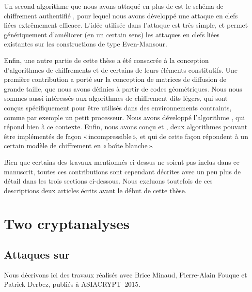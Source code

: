 Un second algorithme que nous avons attaqué en plus de \shaone est le schéma de chiffrement authentifié \proestotr, pour lequel nous avons développé une attaque en clefs liées
extrêmement efficace. L'idée utilisée dans l'attaque est très simple, et permet génériquement d'améliorer (en un certain sens) les attaques en clefs liées existantes sur les constructions
de type Even-Mansour.

\medskip

Enfin, une autre partie de cette thèse a été consacrée à la conception d'algorithmes de chiffrements et de certains de leurs éléments constitutifs.
Une première contribution a porté sur la conception de matrices de diffusion de grande taille, que nous avons définies à partir de codes géométriques.
Nous nous sommes aussi intéressés aux algorithmes de chiffrement dits légers, qui sont conçus spécifiquement pour être utilisés dans des environnements
contraints, comme par exemple un petit processeur. Nous avons développé l'algorithme \fly, qui répond bien à ce contexte.
Enfin, nous avons conçu \pc et \cdb, deux algorithmes pouvant être implémentés de façon «\,incompressible\,», et qui de cette façon répondent à un certain modèle
de chiffrement en «\,boîte blanche\,». 

\bigskip

Bien que certains des travaux mentionnés ci-dessus ne soient pas inclus dans ce manuscrit, toutes ces contributions sont cependant
décrites avec un peu plus de détail dans les trois sections ci-dessous. Nous excluons toutefois de ces descriptions deux articles écrits avant le début de cette thèse.

\section[Deux cryptanalyses]{Two cryptanalyses}

\subsection{Attaques sur \asasa \cite{DBLP:conf/asiacrypt/MinaudDFK15}}
Nous décrivons ici des travaux réalisés avec Brice Minaud, Pierre-Alain Fouque et Patrick Derbez, publiés à ASIACRYPT~2015.

\medskip


